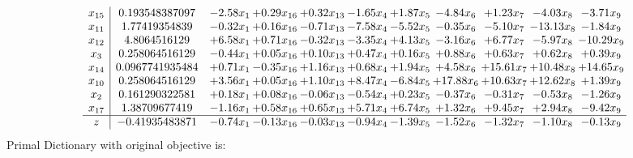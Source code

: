 \documentclass[9pt]{article}
\begin{document}
\[\begin{array}{c| c c@{\hskip 2pt} c@{\hskip 2pt} c@{\hskip 2pt} c@{\hskip 2pt} c@{\hskip 2pt} c@{\hskip 2pt} c@{\hskip 2pt} c@{\hskip 2pt} c@{\hskip 2pt} }
 x_{15}   &  0.193548387097 & -2.58 x_{1} & +  0.29 x_{16} & +  0.32 x_{13} & -1.65 x_{4} & +  1.87 x_{5} & -4.84 x_{6} & +  1.23 x_{7} & -4.03 x_{8} & -3.71 x_{9}\\
 x_{11}   &  1.77419354839 & -0.32 x_{1} & +  0.16 x_{16} & -0.71 x_{13} & -7.58 x_{4} & -5.52 x_{5} & -0.35 x_{6} & -5.10 x_{7} & -13.13 x_{8} & -1.84 x_{9}\\
 x_{12}   &  4.8064516129 & +  6.58 x_{1} & +  0.71 x_{16} & -0.32 x_{13} & -3.35 x_{4} & +  4.13 x_{5} & -3.16 x_{6} & +  6.77 x_{7} & -5.97 x_{8} & -10.29 x_{9}\\
 x_{3}   &  0.258064516129 & -0.44 x_{1} & +  0.05 x_{16} & +  0.10 x_{13} & +  0.47 x_{4} & +  0.16 x_{5} & +  0.88 x_{6} & +  0.63 x_{7} & +  0.62 x_{8} & +  0.39 x_{9}\\
 x_{14}   &  0.0967741935484 & +  0.71 x_{1} & -0.35 x_{16} & +  1.16 x_{13} & +  0.68 x_{4} & +  1.94 x_{5} & +  4.58 x_{6} & + 15.61 x_{7} & + 10.48 x_{8} & + 14.65 x_{9}\\
 x_{10}   &  0.258064516129 & +  3.56 x_{1} & +  0.05 x_{16} & +  1.10 x_{13} & +  8.47 x_{4} & -6.84 x_{5} & + 17.88 x_{6} & + 10.63 x_{7} & + 12.62 x_{8} & +  1.39 x_{9}\\
 x_{2}   &  0.161290322581 & +  0.18 x_{1} & +  0.08 x_{16} & -0.06 x_{13} & -0.54 x_{4} & +  0.23 x_{5} & -0.37 x_{6} & -0.31 x_{7} & -0.53 x_{8} & -1.26 x_{9}\\
 x_{17}   &  1.38709677419 & -1.16 x_{1} & +  0.58 x_{16} & +  0.65 x_{13} & +  5.71 x_{4} & +  6.74 x_{5} & +  1.32 x_{6} & +  9.45 x_{7} & +  2.94 x_{8} & -9.42 x_{9}\\
\hline
z    &  -0.41935483871 & -0.74 x_{1} & -0.13 x_{16} & -0.03 x_{13} & -0.94 x_{4} & -1.39 x_{5} & -1.52 x_{6} & -1.32 x_{7} & -1.10 x_{8} & -0.13 x_{9}\\
\end{array}\]
Primal Dictionary with original objective is:
\end{document}
